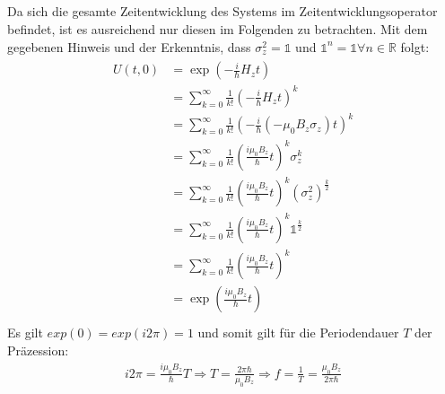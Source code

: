 \documentclass[a4paper,11pt]{article}
\begin{document}
\subsection{}
Da sich die gesamte Zeitentwicklung des Systems im Zeitentwicklungsoperator befindet, ist es ausreichend nur diesen im Folgenden zu betrachten.
Mit dem gegebenen Hinweis und der Erkenntnis, dass $\sigma_z^2 = \mathbb{1}$ und $\mathbb{1}^n = \mathbb{1} \forall n \in \mathbb{R}$ folgt:
\begin{align}
        \begin{split}
                U(t, 0) &= \exp\left(-\frac{i}{\hbar}H_zt\right) \\
                        &= \sum_{k=0}^\infty \frac{1}{k!}\left(-\frac{i}{\hbar} H_zt\right)^k \\
                        &= \sum_{k=0}^\infty \frac{1}{k!}\left(-\frac{i}{\hbar} (-\mu_0B_z\sigma_z)t\right)^k \\
                        &= \sum_{k=0}^\infty \frac{1}{k!}\left(\frac{i\mu_0B_z}{\hbar}t\right)^k \sigma_z^k \\
                        &= \sum_{k=0}^\infty \frac{1}{k!}\left(\frac{i\mu_0B_z}{\hbar}t\right)^k (\sigma_z^2)^\frac{k}{2} \\
                        &= \sum_{k=0}^\infty \frac{1}{k!}\left(\frac{i\mu_0B_z}{\hbar}t\right)^k \mathbb{1}^\frac{k}{2} \\
                        &= \sum_{k=0}^\infty \frac{1}{k!}\left(\frac{i\mu_0B_z}{\hbar}t\right)^k \\
                        &= \exp\left(\frac{i\mu_0B_z}{\hbar}t\right) \\
        \end{split}
\end{align}
Es gilt $exp(0) = exp(i2\pi) = 1$ und somit gilt für die Periodendauer $T$ der Präzession:
\begin{align}
        i2\pi = \frac{i\mu_0B_z}{\hbar}T \Rightarrow T = \frac{2\pi\hbar}{\mu_0B_z} \Rightarrow f = \frac{1}{T} = \frac{\mu_0B_z}{2\pi\hbar}
\end{align}
\end{document}
